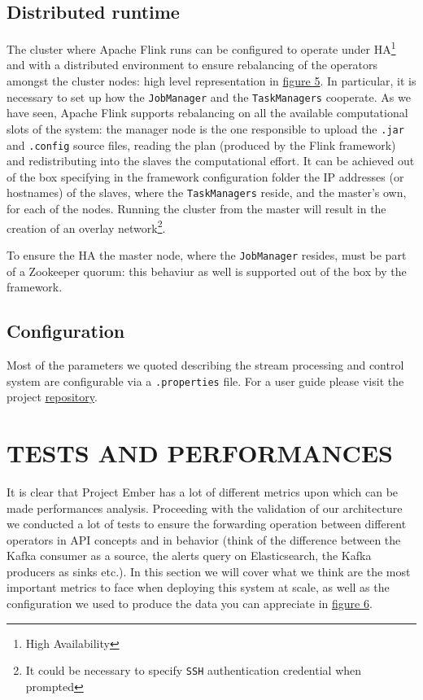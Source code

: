 \subsection{Distributed runtime}
The cluster where Apache Flink runs can be configured to operate under HA\footnote{High Availability} and with a distributed environment to ensure rebalancing of the operators amongst the cluster nodes: high level representation in \hyperref[fig:ember_ha]{figure 5}. 
In particular, it is necessary to set up how the \texttt{JobManager} and the \texttt{TaskManagers} cooperate. As we have seen, Apache Flink supports rebalancing on all the available computational slots of the system: the manager node is the one responsible to upload the \texttt{.jar} and \texttt{.config} source files, reading the plan (produced by the Flink framework) and redistributing into the slaves the computational effort. It can be achieved out of the box specifying in the framework configuration folder the IP addresses (or hostnames) of the slaves, where the \texttt{TaskManagers} reside, and the master's own, for each of the nodes. Running the cluster from the master will result in the creation of an overlay network\footnote{It could be necessary to specify \texttt{SSH} authentication credential when prompted}.

To ensure the HA the master node, where the \texttt{JobManager} resides, must be part of a Zookeeper quorum: this behaviur as well is supported out of the box by the framework.

\subsection{Configuration}
Most of the parameters we quoted describing the stream processing and control system are configurable via a \texttt{.properties} file. For a user guide please visit the project \href{https://github.com/projectember/project-ember}{repository}.


\section{TESTS AND PERFORMANCES}
It is clear that Project Ember has a lot of different metrics upon which can be made performances analysis. Proceeding with the validation of our architecture we conducted a lot of tests to ensure the forwarding operation between different operators in API concepts and in behavior (think of the difference between the Kafka consumer as a source, the alerts query on Elasticsearch, the Kafka producers as sinks etc.). In this section we will cover what we think are the most important metrics to face when deploying this system at scale, as well as the configuration we used to produce the data you can appreciate in \hyperref[fig:ember_metrics]{figure 6}.

